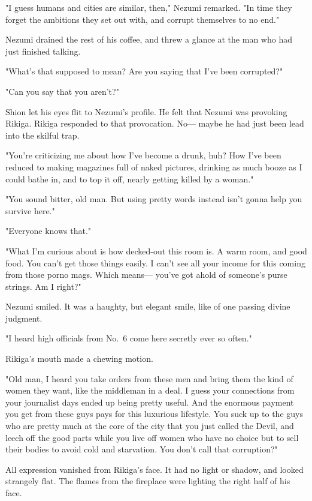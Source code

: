 "I guess humans and cities are similar, then," Nezumi remarked. "In time
they forget the ambitions they set out with, and corrupt themselves to
no end."

Nezumi drained the rest of his coffee, and threw a glance at the man who
had just finished talking.

"What's that supposed to mean? Are you saying that I've been corrupted?"

"Can you say that you aren't?"

Shion let his eyes flit to Nezumi's profile. He felt that Nezumi was
provoking Rikiga. Rikiga responded to that provocation. No--- maybe he had
just been lead into the skilful trap.

"You're criticizing me about how I've become a drunk, huh? How I've been
reduced to making magazines full of naked pictures, drinking as much
booze as I could bathe in, and to top it off, nearly getting killed by a
woman."

"You sound bitter, old man. But using pretty words instead isn't gonna
help you survive here."

"Everyone knows that."

"What I'm curious about is how decked-out this room is. A warm room, and
good food. You can't get those things easily. I can't see all your
income for this coming from those porno mags. Which means--- you've got
ahold of someone's purse strings. Am I right?"

Nezumi smiled. It was a haughty, but elegant smile, like of one passing
divine judgment.

"I heard high officials from No.~6 come here secretly ever so often."

Rikiga's mouth made a chewing motion.

"Old man, I heard you take orders from these men and bring them the kind
of women they want, like the middleman in a deal. I guess your
connections from your journalist days ended up being pretty useful. And
the enormous payment you get from these guys pays for this luxurious
lifestyle. You suck up to the guys who are pretty much at the core of
the city that you just called the Devil, and leech off the good parts
while you live off women who have no choice but to sell their bodies to
avoid cold and starvation. You don't call that corruption?"

All expression vanished from Rikiga's face. It had no light or shadow,
and looked strangely flat. The flames from the fireplace were lighting
the right half of his face.

